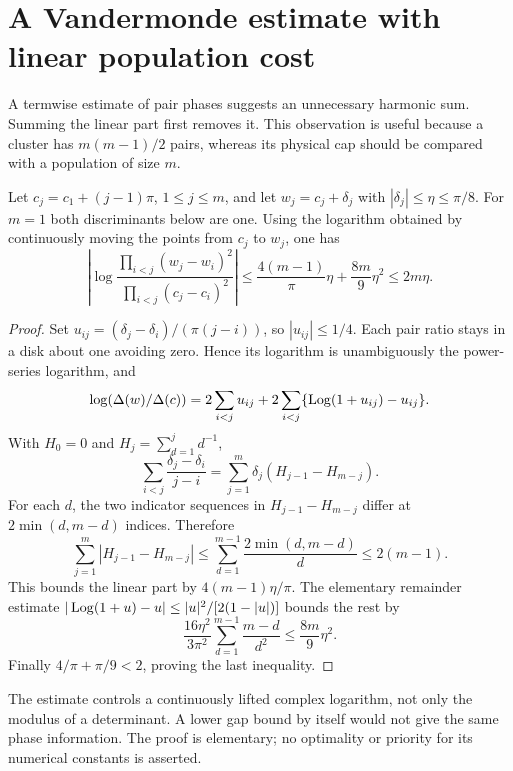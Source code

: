 \section{A Vandermonde estimate with linear population cost}
\label{sec:vandermonde}

A termwise estimate of pair phases suggests an unnecessary harmonic
sum. Summing the linear part first removes it. This observation is
useful because a cluster has $m(m-1)/2$ pairs, whereas its physical
cap should be compared with a population of size $m$.

\begin{lemma}
\label{lem:vandermonde}
Let $c_j=c_1+(j-1)\pi$, $1\le j\le m$, and let
$w_j=c_j+\delta_j$ with $|\delta_j|\le\eta\le\pi/8$.
For $m=1$ both discriminants below are one. Using the logarithm
obtained by continuously moving the points from
$c_j$ to $w_j$, one has
\begin{equation}
 \left|\log\frac{\prod_{i<j}(w_j-w_i)^2}
                      {\prod_{i<j}(c_j-c_i)^2}\right|
 \le \frac{4(m-1)}\pi\eta+\frac{8m}{9}\eta^2
 \le 2m\eta.
 \label{eq:vandermondebound}
\end{equation}
\end{lemma}
\begin{proof}
Set $u_{ij}=(\delta_j-\delta_i)/(\pi(j-i))$, so $|u_{ij}|\le1/4$.
Each pair ratio stays in a disk about one avoiding zero. Hence its
logarithm is unambiguously the power-series logarithm, and
\[
 \log(\Delta(w)/\Delta(c))
 =2\sum_{i<j}u_{ij}+2\sum_{i<j}\{\operatorname{Log}(1+u_{ij})-u_{ij}\}.
\]
With $H_0=0$ and $H_j=\sum_{d=1}^j d^{-1}$,
\[
 \sum_{i<j}\frac{\delta_j-\delta_i}{j-i}
 =\sum_{j=1}^m\delta_j(H_{j-1}-H_{m-j}).
\]
For each $d$, the two indicator sequences in
$H_{j-1}-H_{m-j}$ differ at $2\min(d,m-d)$ indices. Therefore
\[
 \sum_{j=1}^m|H_{j-1}-H_{m-j}|
 \le\sum_{d=1}^{m-1}\frac{2\min(d,m-d)}d
 \le2(m-1).
\]
This bounds the linear part by $4(m-1)\eta/\pi$.
The elementary remainder estimate
$|\operatorname{Log}(1+u)-u|\le |u|^2/[2(1-|u|)]$ bounds the rest by
\[
 \frac{16\eta^2}{3\pi^2}
       \sum_{d=1}^{m-1}\frac{m-d}{d^2}
 \le\frac{8m}{9}\eta^2.
\]
Finally $4/\pi+\pi/9<2$, proving the last inequality.
\end{proof}

The estimate controls a continuously lifted complex logarithm, not
only the modulus of a determinant. A lower gap bound by itself
would not give the same phase information. The proof is elementary;
no optimality or priority for its numerical constants is asserted.

